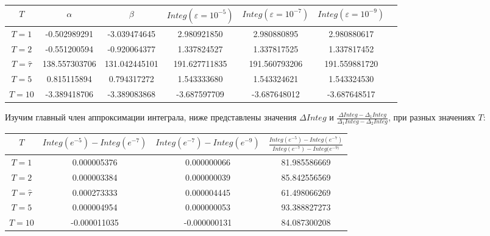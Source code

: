 \documentclass{article}
\theoremstyle{remark}
\theoremstyle{definition}
\begin{document}
		\begin{table}[H]
		\begin{center}
			\begin{tabular}{|c||c|c|c|c|c|c|}
			\hline
$T$ & $\alpha$ & $\beta $ & $Integ(\varepsilon=10^{-5})$ & $Integ(\varepsilon=10^{-7})$ & $Integ(\varepsilon=10^{-9})$  \\  
				\hline
					\hline
$T=1$ & -0.502989291 & -3.039474645 & 2.980921850 & 2.980880895 & 2.980880617 \\ 
$T=2$ & -0.551200594 & -0.920064377 & 1.337824527 & 1.337817525 & 1.337817452 \\ 
$T= \widehat{\tau} $ & 138.557303706 & 131.042445101 & 191.627711835 & 191.560793206 & 191.559881720 \\ 
$T=5$ & 0.815115894 & 0.794317272 & 1.543333680 & 1.543324621 & 1.543324530 \\ 
$T=10$ & -3.389418706 & -3.389083868 & -3.687597709 & -3.687648012 & -3.687648517 \\                                                                                               
\hline 
			\end{tabular}
		\end{center}
	\end{table}	
		Изучим главный член аппроксимации интеграла, ниже представлены значения $\Delta Integ $ и $\frac{\Delta Integ -\Delta_1 Integ }{\Delta_1 Integ- \Delta_2 Integ}$, при разных значениях $T$:
		
	
	

		\begin{table}[H]
		\begin{center}
			\begin{tabular}{|c||c|c|c|}
			\hline
$T$ & $Integ(e^{-5}) - Integ(e^{-7})$ & $Integ(e^{-7}) - Integ(e^{-9})$  & $\frac{Integ(e^{-5}) - Integ(e^{-7})}{Integ(e^{-7}) - Integ(e^{-9)}}$ \\  
				\hline
					\hline
$T=1$ & 0.000005376 & 0.000000066 & 81.985586669 \\ 
 $T=2$ & 0.000003384 & 0.000000039 & 85.842556569 \\ 
$T= \widehat{\tau} $ & 0.000273333 & 0.000004445 & 61.498066269 \\ 
$T=5$ & 0.000004954 & 0.000000053 & 93.388827273 \\ 
$T=10$ & -0.000011035 & -0.000000131 & 84.087300208 \\              
\hline 
			\end{tabular}
		\end{center}
	\end{table}	
\end{document}

